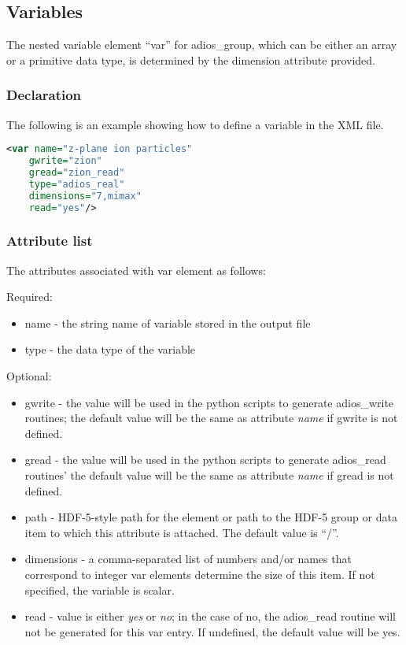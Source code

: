 \subsection{Variables}
The nested variable element ``var'' for adios\_group, which can be either an array 
or a primitive data type, is determined by the dimension attribute provided. 

\subsubsection{Declaration}

The following is an example showing how to define a variable in the XML file. 
\begin{lstlisting}[language=XML]
<var name="z-plane ion particles"
	gwrite="zion" 
	gread="zion_read" 
	type="adios_real" 
	dimensions="7,mimax" 
	read="yes"/>
\end{lstlisting}

\subsubsection{Attribute list}
The attributes associated with var element  as follows: 

Required:
\begin{itemize}
\item name - the string name of variable stored in the output file
\item type - the data type of the variable
\end{itemize}

Optional: 
\begin{itemize}
\item gwrite - the value will be used in the python scripts to generate adios\_write 
routines; the default value will be the same as attribute \textit{name} if gwrite 
is not defined.
\item gread - the value will be used in the python scripts to generate adios\_read routines' 
the default value will be the same as attribute \textit{name} if  gread is not 
defined.
\item path - HDF-5-style path for the element or path to the HDF-5 group or data item 
to which this attribute is attached.  The default value is ``/''.
\item dimensions - a comma-separated list of numbers and/or names that correspond to 
integer var elements determine the size of this item. If not specified, the variable 
is scalar.
\item read - value is either \textit{yes} or \textit{no}; in the case of no, the adios\_read 
routine will not be generated for this var entry. If undefined, the default value 
will be yes. 
\end{itemize}

